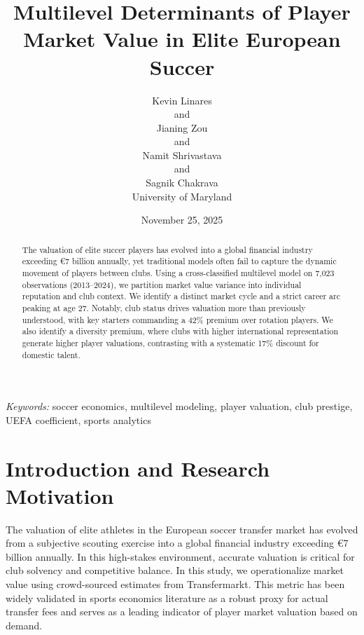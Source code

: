\documentclass[
  12pt]{article}
\begin{document}
\def\spacingset#1{\renewcommand{\baselinestretch}%
{#1}\small\normalsize} \spacingset{1}



\date{November 25, 2025}
\title{\bf Multilevel Determinants of Player Market Value in Elite
European Succer}
\author{
Kevin Linares\\
and\\Jianing Zou\\
and\\Namit Shrivastava\\
and\\Sagnik Chakrava\\
University of Maryland\\
}
\maketitle

\bigskip
\bigskip
\begin{abstract}
The valuation of elite succer players has evolved into a global
financial industry exceeding €7 billion annually, yet traditional models
often fail to capture the dynamic movement of players between clubs.
Using a cross-classified multilevel model on 7,023 observations
(2013--2024), we partition market value variance into individual
reputation and club context. We identify a distinct market cycle and a
strict career arc peaking at age 27. Notably, club status drives
valuation more than previously understood, with key starters commanding
a 42\% premium over rotation players. We also identify a diversity
premium, where clubs with higher international representation generate
higher player valuations, contrasting with a systematic 17\% discount
for domestic talent.
\end{abstract}

\noindent%
{\it Keywords:} soccer economics, multilevel modeling, player valuation,
club prestige, UEFA coefficient, sports analytics
\vfill

\newpage
\spacingset{1.9} %


\section{Introduction and Research
Motivation}\label{introduction-and-research-motivation}

The valuation of elite athletes in the European soccer transfer market
has evolved from a subjective scouting exercise into a global financial
industry exceeding €7 billion annually. In this high-stakes environment,
accurate valuation is critical for club solvency and competitive
balance. In this study, we operationalize market value using
crowd-sourced estimates from Transfermarkt. This metric has been widely
validated in sports economics literature as a robust proxy for actual
transfer fees and serves as a leading indicator of player market
valuation based on demand.
\end{document}

